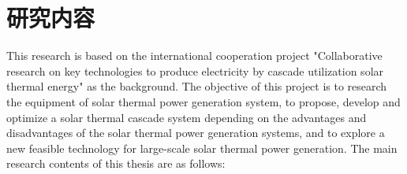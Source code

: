 \section{研究内容}
\label{sec:researchContent}

This research is based on the international cooperation project "Collaborative research on key technologies to produce electricity by cascade utilization solar thermal energy" as the background. The objective of this project is to research the equipment of solar thermal power generation system, to propose, develop and optimize a solar thermal cascade system depending on the advantages and disadvantages of the solar thermal power generation systems, and to explore a new feasible technology for large-scale solar thermal power generation. The main research contents of this thesis are as follows:

